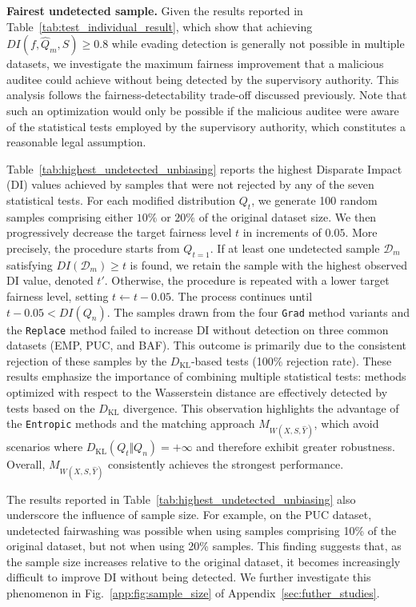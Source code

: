 \documentclass[runningheads, orivec]{llncs}
\newcommand{\KL}{D_{\mathrm{KL}}}
\begin{document}
\textbf{Fairest undetected sample.} Given the results reported in Table~\ref{tab:test_individual_result}, which show that achieving $DI(f, \widehat{Q}_m, S) \geq 0.8$ while evading detection is generally not possible in multiple datasets, we investigate the maximum fairness improvement that a malicious auditee could achieve without being detected by the supervisory authority. This analysis follows the fairness-detectability trade-off discussed previously. Note that such an optimization would only be possible if the malicious auditee were aware of the statistical tests employed by the supervisory authority, which constitutes a reasonable legal assumption.

Table~\ref{tab:highest_undetected_unbiasing} reports the highest Disparate Impact (DI) values achieved by samples that were not rejected by any of the seven statistical tests. For each modified distribution $Q_t$, we generate 100 random samples comprising either $10\%$ or $20\%$ of the original dataset size. We then progressively decrease the target fairness level $t$ in increments of $0.05$. More precisely, the procedure starts from $Q_{t=1}$. If at least one undetected sample $\mathcal{D}_m$ satisfying $DI(\mathcal{D}_m) \geq t$ is found, we retain the sample with the highest observed DI value, denoted $t'$. Otherwise, the procedure is repeated with a lower target fairness level, setting $t \leftarrow t - 0.05$. The process continues until $t - 0.05 < DI(Q_n)$. The samples drawn from the four \texttt{Grad} method variants and the \texttt{Replace} method failed to increase DI without detection on three common datasets (EMP, PUC, and BAF). This outcome is primarily due to the consistent rejection of these samples by the $\KL$-based tests (100\% rejection rate). These results emphasize the importance of combining multiple statistical tests: methods optimized with respect to the Wasserstein distance are effectively detected by tests based on the $\KL$ divergence. This observation highlights the advantage of the \texttt{Entropic} methods and the matching approach $M_{W(X,S,\widehat{Y})}$, which avoid scenarios where $\KL(Q_t \Vert Q_n) = +\infty$ and therefore exhibit greater robustness. Overall, $M_{W(X,S,\widehat{Y})}$ consistently achieves the strongest performance. 

The results reported in Table~\ref{tab:highest_undetected_unbiasing} also underscore the influence of sample size. For example, on the PUC dataset, undetected fairwashing was possible when using samples comprising 10\% of the original dataset, but not when using 20\% samples. This finding suggests that, as the sample size increases relative to the original dataset, it becomes increasingly difficult to improve DI without being detected. We further investigate this phenomenon in Fig.~\ref{app:fig:sample_size} of Appendix~\ref{sec:futher_studies}.
\end{document}

